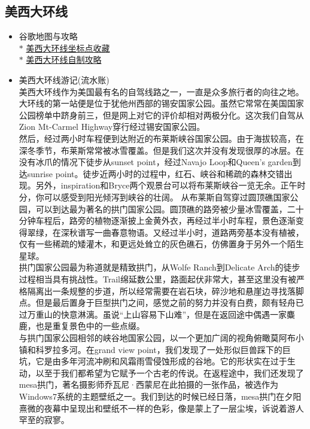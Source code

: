     \subsection{美西大环线}
    \begin{itemize}
        \item 谷歌地图与攻略 \\
        $\ast$ \href{https://maps.app.goo.gl/CcrQn4tGMGdN5zgY7}{美西大环线坐标点收藏} \\
        $\ast$ \href{https://docs.qq.com/sheet/DSFBqdnpUUWxFQ2tR}{美西大环线自制攻略} \\
        \item 美西大环线游记(流水账) \\
美西大环线作为美国最有名的自驾线路之一，一直是众多旅行者的向往之地。
大环线的第一站便是位于犹他州西部的锡安国家公园。虽然它常常在美国国家公园榜单中跻身前三，但是网上对它的评价却相对两极分化。这次我们自驾从Zion Mt-Carmel Highway穿行经过锡安国家公园。\\
然后，经过两小时车程便到达附近的布莱斯峡谷国家公园。由于海拔较高，在深冬季节，布莱斯常常被冰雪覆盖。但是我们这次并没有发现很厚的冰层。在没有冰爪的情况下徒步从sunset point，经过Navajo Loop和Queen's garden到达sunrise point。徒步近两小时的过程中，红石、峡谷和稀疏的森林交错出现。另外，inspiration和Bryce两个观景台可以将布莱斯峡谷一览无余。正午时分，你可以感受到阳光倾泻到峡谷的壮阔。
从布莱斯自驾穿过圆顶礁国家公园，可以到达最为著名的拱门国家公园。圆顶礁的路旁被少量冰雪覆盖，二十分钟车程后，路旁的植物逐渐披上金黄外衣，再经过半小时车程，景色逐渐变得翠绿，在深秋谱写一曲春意物语。又经过半小时，道路两旁基本没有植被，仅有一些稀疏的矮灌木，和更远处耸立的灰色礁石，仿佛置身于另外一个陌生星球。\\
拱门国家公园最为称道就是精致拱门，从Wolfe Ranch到Delicate Arch的徒步过程相当具有挑战性。Trail绵延数公里，路面起伏非常大，甚至这里没有被严格隔离出一条规整的步道，所以经常需要在岩石块，碎沙地和悬崖边寻找落脚点。但是最后置身于巨型拱门之间，感觉之前的努力并没有白费，颇有轻舟已过万重山的快意淋漓。虽说“上山容易下山难”，但是在返回途中偶遇一家麋鹿，也是重复景色中的一些点缀。\\
与拱门国家公园相邻的峡谷地国家公园，以一个更加广阔的视角俯瞰莫阿布小镇和科罗拉多河。在grand view point，我们发现了一处形似巨兽踩下的巨坑，它是由多年河流冲刷和风霜雨雪侵蚀形成的谷地。它的形状实在过于生动，以至于我们都希望为它赋予一个古老的传说。在返程途中，我们还发现了mesa拱门，著名摄影师乔瓦尼·西蒙尼在此拍摄的一张作品，被选作为Windows7系统的主题壁纸之一。我们到达的时候已经日落，mesa拱门在夕阳熹微的夜幕中呈现出和壁纸不一样的色彩，像是蒙上了一层尘埃，诉说着游人罕至的寂寥。\\

\end{itemize}
